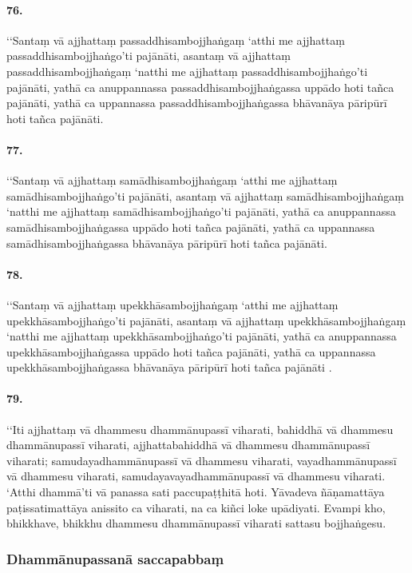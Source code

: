 \paragraph{76.} ‘‘Santaṃ vā ajjhattaṃ passaddhisambojjhaṅgaṃ ‘atthi me ajjhattaṃ passaddhisambojjhaṅgo’ti pajānāti, asantaṃ vā ajjhattaṃ passaddhisambojjhaṅgaṃ ‘natthi me ajjhattaṃ passaddhisambojjhaṅgo’ti pajānāti, yathā ca anuppannassa passaddhisambojjhaṅgassa uppādo hoti tañca pajānāti, yathā ca uppannassa passaddhisambojjhaṅgassa bhāvanāya pāripūrī hoti tañca pajānāti.

\paragraph{77.} ‘‘Santaṃ vā ajjhattaṃ samādhisambojjhaṅgaṃ ‘atthi me ajjhattaṃ samādhisambojjhaṅgo’ti pajānāti, asantaṃ vā ajjhattaṃ samādhisambojjhaṅgaṃ ‘natthi me ajjhattaṃ samādhisambojjhaṅgo’ti pajānāti, yathā ca anuppannassa samādhisambojjhaṅgassa uppādo hoti tañca pajānāti, yathā ca uppannassa samādhisambojjhaṅgassa bhāvanāya pāripūrī hoti tañca pajānāti.

\paragraph{78.} ‘‘Santaṃ vā ajjhattaṃ upekkhāsambojjhaṅgaṃ ‘atthi me ajjhattaṃ upekkhāsambojjhaṅgo’ti pajānāti, asantaṃ vā ajjhattaṃ upekkhāsambojjhaṅgaṃ ‘natthi me ajjhattaṃ upekkhāsambojjhaṅgo’ti pajānāti, yathā ca anuppannassa upekkhāsambojjhaṅgassa uppādo hoti tañca pajānāti, yathā ca uppannassa upekkhāsambojjhaṅgassa bhāvanāya pāripūrī hoti tañca pajānāti .

\paragraph{79.} ‘‘Iti ajjhattaṃ vā dhammesu dhammānupassī viharati, bahiddhā vā dhammesu dhammānupassī viharati, ajjhattabahiddhā vā dhammesu dhammānupassī viharati; samudayadhammānupassī vā dhammesu viharati, vayadhammānupassī vā dhammesu viharati, samudayavayadhammānupassī vā dhammesu viharati. ‘Atthi dhammā’ti vā panassa sati paccupaṭṭhitā hoti. Yāvadeva ñāṇamattāya paṭissatimattāya anissito ca viharati, na ca kiñci loke upādiyati. Evampi kho, bhikkhave, bhikkhu dhammesu dhammānupassī viharati sattasu bojjhaṅgesu.


\subsubsection{Dhammānupassanā saccapabbaṃ}

